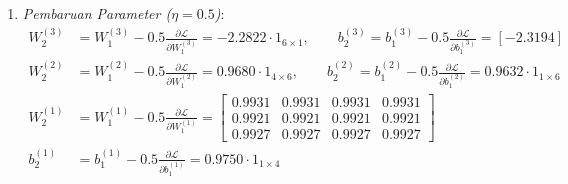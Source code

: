 \documentclass[11pt,a4paper]{article}
\def\mathbf#1{#1}%
\theoremstyle{plain}
\theoremstyle{definition}
\theoremstyle{remark}
\begin{document}
\begin{enumerate}
    \item \textit{Pembaruan Parameter ($\eta = 0.5$)}:
    \begin{align}
        W^{(3)}_2 &= W^{(3)}_1 - 0.5 \frac{\partial \mathcal{L}}{\partial W^{(3)}_1} = -2.2822 \cdot \mathbf{1}_{6 \times 1}, \qquad \mathbf{b}^{(3)}_2 = \mathbf{b}^{(3)}_1 - 0.5 \frac{\partial \mathcal{L}}{\partial \mathbf{b}^{(3)}_1} = [-2.3194] \\[0.2em]
        W^{(2)}_2 &= W^{(2)}_1 - 0.5 \frac{\partial \mathcal{L}}{\partial W^{(2)}_1} = 0.9680 \cdot \mathbf{1}_{4 \times 6}, \qquad \mathbf{b}^{(2)}_2 = \mathbf{b}^{(2)}_1 - 0.5 \frac{\partial \mathcal{L}}{\partial \mathbf{b}^{(2)}_1} = 0.9632 \cdot \mathbf{1}_{1 \times 6} \\[0.2em]
        W^{(1)}_2 &= W^{(1)}_1 - 0.5 \frac{\partial \mathcal{L}}{\partial W^{(1)}_1} = \begin{bmatrix}
            0.9931 & 0.9931 & 0.9931 & 0.9931 \\
            0.9921 & 0.9921 & 0.9921 & 0.9921 \\
            0.9927 & 0.9927 & 0.9927 & 0.9927
        \end{bmatrix} \\[0.2em]
        \mathbf{b}^{(1)}_2 &= \mathbf{b}^{(1)}_1 - 0.5 \frac{\partial \mathcal{L}}{\partial \mathbf{b}^{(1)}_1} = 0.9750 \cdot \mathbf{1}_{1 \times 4}
    \end{align}
\end{enumerate}
\end{document}
